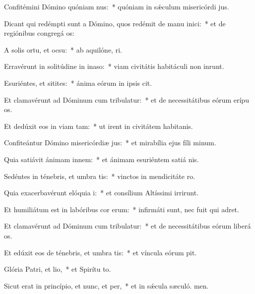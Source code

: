 \item Confitémini Dómino quóniam nus:~* quóniam in sǽculum misericórdi jus.
\item Dicant qui redémpti sunt a Dómino, quos redémit de manu inici:~* et de regiónibus congregá os:
\item A solis ortu, et ocsu:~* ab aquilóne,  ri.
\item Erravérunt in solitúdine in inaso:~* viam civitátis habitáculi non inrunt.
\item Esuriéntes, et sitites:~* ánima eórum in ipsis cit.
\item Et clamavérunt ad Dóminum cum tribulatur:~* et de necessitátibus eórum erípu os.
\item Et dedúxit eos in viam tam:~* ut irent in civitátem habitanis.
\item Confiteántur Dómino misericórdiæ jus:~* et mirabília ejus fíli minum.
\item Quia satiávit ánimam innem:~* et ánimam esuriéntem satiá nis.
\item Sedéntes in ténebris, et umbra tis:~* vinctos in mendicitáte  ro.
\item Quia exacerbavérunt elóquia i:~* et consílium Altíssimi irrirunt.
\item Et humiliátum est in labóribus cor erum:~* infirmáti sunt, nec fuit qui adret.
\item Et clamavérunt ad Dóminum cum tribulatur:~* et de necessitátibus eórum liberá os.
\item Et edúxit eos de ténebris, et umbra tis:~* et víncula eórum pit.
\item Glória Patri, et lio,~* et Spirítu to.
\item Sicut erat in princípio, et nunc, et per,~* et in sǽcula sæculó. men.
